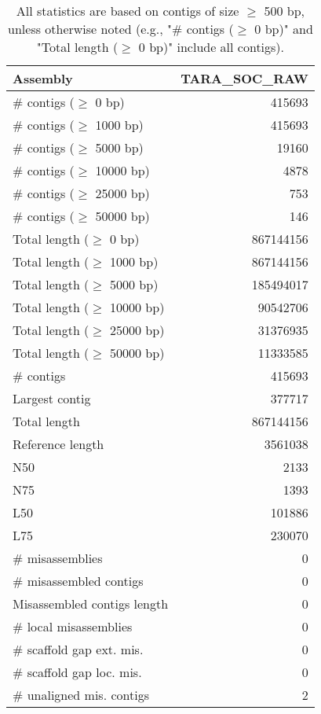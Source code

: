 \documentclass[12pt,a4paper]{article}
\begin{document}
\begin{table}[ht]
\begin{center}
\caption{All statistics are based on contigs of size $\geq$ 500 bp, unless otherwise noted (e.g., "\# contigs ($\geq$ 0 bp)" and "Total length ($\geq$ 0 bp)" include all contigs).}
\begin{tabular}{|l*{1}{|r}|}
\hline
Assembly & TARA\_SOC\_RAW \\ \hline
\# contigs ($\geq$ 0 bp) & 415693 \\ \hline
\# contigs ($\geq$ 1000 bp) & 415693 \\ \hline
\# contigs ($\geq$ 5000 bp) & 19160 \\ \hline
\# contigs ($\geq$ 10000 bp) & 4878 \\ \hline
\# contigs ($\geq$ 25000 bp) & 753 \\ \hline
\# contigs ($\geq$ 50000 bp) & 146 \\ \hline
Total length ($\geq$ 0 bp) & 867144156 \\ \hline
Total length ($\geq$ 1000 bp) & 867144156 \\ \hline
Total length ($\geq$ 5000 bp) & 185494017 \\ \hline
Total length ($\geq$ 10000 bp) & 90542706 \\ \hline
Total length ($\geq$ 25000 bp) & 31376935 \\ \hline
Total length ($\geq$ 50000 bp) & 11333585 \\ \hline
\# contigs & 415693 \\ \hline
Largest contig & 377717 \\ \hline
Total length & 867144156 \\ \hline
Reference length & 3561038 \\ \hline
N50 & 2133 \\ \hline
N75 & 1393 \\ \hline
L50 & 101886 \\ \hline
L75 & 230070 \\ \hline
\# misassemblies & 0 \\ \hline
\# misassembled contigs & 0 \\ \hline
Misassembled contigs length & 0 \\ \hline
\# local misassemblies & 0 \\ \hline
\# scaffold gap ext. mis. & 0 \\ \hline
\# scaffold gap loc. mis. & 0 \\ \hline
\# unaligned mis. contigs & 2 \\ \hline

\end{tabular}
\end{center}
\end{table}
\end{document}
